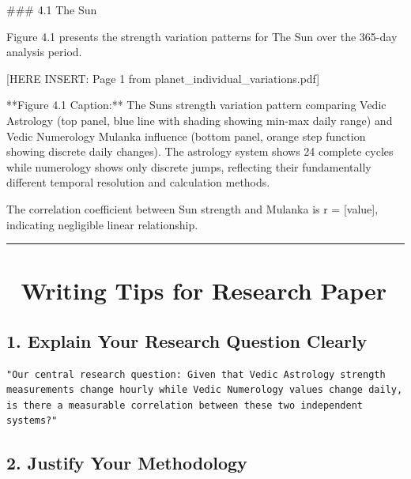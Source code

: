 \documentclass[
  11pt,
  oneside,
  openany]{scrbook}
\newenvironment{Shaded}{\begin{snugshade}}{\end{snugshade}}
\newcommand{\CommentTok}[1]{\textcolor[rgb]{0.37,0.37,0.37}{#1}}
\newcommand{\FunctionTok}[1]{\textcolor[rgb]{0.28,0.35,0.67}{#1}}
\newcommand{\NormalTok}[1]{\textcolor[rgb]{0.00,0.23,0.31}{#1}}
\newcommand{\OtherTok}[1]{\textcolor[rgb]{0.00,0.23,0.31}{#1}}
\begin{document}
\begin{Shaded}
\begin{Highlighting}[]
\FunctionTok{\#\#\# 4.1 The Sun}

\NormalTok{Figure 4.1 presents the strength variation patterns for The Sun over }
\NormalTok{the 365{-}day analysis period.}

\CommentTok{[}\OtherTok{HERE INSERT: Page 1 from planet\_individual\_variations.pdf}\CommentTok{]}

\NormalTok{**Figure 4.1 Caption:**}
\NormalTok{The Sun\textquotesingle{}s strength variation pattern comparing Vedic Astrology }
\NormalTok{(top panel, blue line with shading showing min{-}max daily range) }
\NormalTok{and Vedic Numerology Mulanka influence (bottom panel, orange }
\NormalTok{step function showing discrete daily changes). The astrology }
\NormalTok{system shows 24 complete cycles while numerology shows only }
\NormalTok{discrete jumps, reflecting their fundamentally different temporal }
\NormalTok{resolution and calculation methods.}

\NormalTok{The correlation coefficient between Sun strength and Mulanka }
\NormalTok{is r = }\CommentTok{[}\OtherTok{value}\CommentTok{]}\NormalTok{, indicating negligible linear relationship.}
\end{Highlighting}
\end{Shaded}

\begin{center}\rule{0.5\linewidth}{0.5pt}\end{center}

\section{📝 Writing Tips for Research
Paper}\label{writing-tips-for-research-paper}

\subsection{1. Explain Your Research Question
Clearly}\label{explain-your-research-question-clearly}

\begin{verbatim}
"Our central research question: Given that Vedic Astrology strength
measurements change hourly while Vedic Numerology values change daily,
is there a measurable correlation between these two independent systems?"
\end{verbatim}

\subsection{2. Justify Your Methodology}\label{justify-your-methodology}
\end{document}
